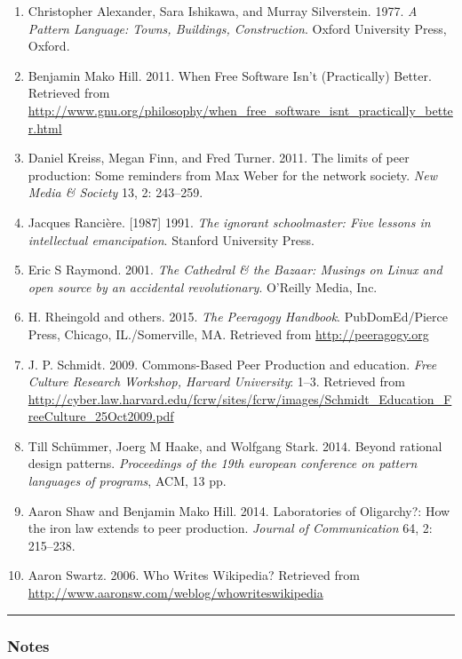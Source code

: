 \begin{enumerate}
\def\labelenumi{\arabic{enumi}.}
\item
  Christopher Alexander, Sara Ishikawa, and Murray Silverstein. 1977.
  \emph{A Pattern Language: Towns, Buildings, Construction}. Oxford
  University Press, Oxford.
\item
  Benjamin Mako Hill. 2011. When Free Software Isn't (Practically)
  Better. Retrieved from
  \url{http://www.gnu.org/philosophy/when_free_software_isnt_practically_better.html}
\item
  Daniel Kreiss, Megan Finn, and Fred Turner. 2011. The limits of peer
  production: Some reminders from Max Weber for the network society.
  \emph{New Media \& Society} 13, 2: 243--259.
\item
  Jacques Rancière. {[}1987{]} 1991. \emph{The ignorant schoolmaster:
  Five lessons in intellectual emancipation}. Stanford University Press.
\item
  Eric S Raymond. 2001. \emph{The Cathedral \& the Bazaar: Musings on
  Linux and open source by an accidental revolutionary}. O'Reilly Media,
  Inc.
\item
  H. Rheingold and others. 2015. \emph{The Peeragogy Handbook}.
  PubDomEd/Pierce Press, Chicago, IL./Somerville, MA. Retrieved from
  \url{http://peeragogy.org}
\item
  J. P. Schmidt. 2009. Commons-Based Peer Production and education.
  \emph{Free Culture Research Workshop, Harvard University}: 1--3.
  Retrieved from
  \url{http://cyber.law.harvard.edu/fcrw/sites/fcrw/images/Schmidt_Education_FreeCulture_25Oct2009.pdf}
\item
  Till Schümmer, Joerg M Haake, and Wolfgang Stark. 2014. Beyond
  rational design patterns. \emph{Proceedings of the 19th european
  conference on pattern languages of programs}, ACM, 13 pp.
\item
  Aaron Shaw and Benjamin Mako Hill. 2014. Laboratories of Oligarchy?:
  How the iron law extends to peer production. \emph{Journal of
  Communication} 64, 2: 215--238.
\item
  Aaron Swartz. 2006. Who Writes Wikipedia? Retrieved from
  \url{http://www.aaronsw.com/weblog/whowriteswikipedia}
\end{enumerate}

\begin{center}\rule{0.5\linewidth}{0.5pt}\end{center}

\hypertarget{notes}{%
\subsubsection{Notes}\label{notes}}
